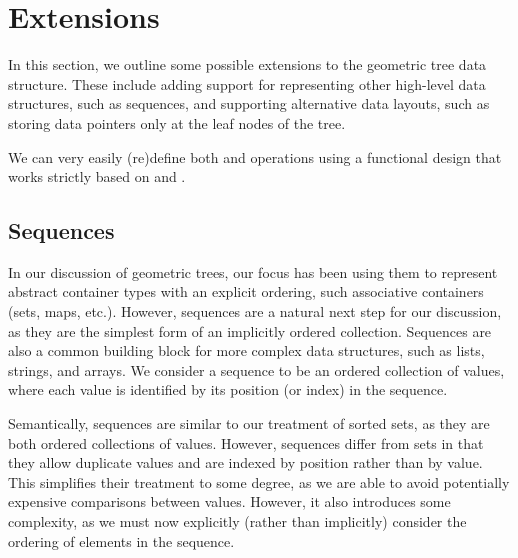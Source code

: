 \documentclass{article}
\let\oldnl\nl%
\newcommand{\nonl}{\renewcommand{\nl}{\let\nl\oldnl}}%
\begin{document}
\appendix

\section{Extensions}

In this section, we outline some possible extensions to the geometric tree data structure. These include adding support for representing other high-level data structures, such as sequences, and supporting alternative data layouts, such as storing data pointers only at the leaf nodes of the tree.

We can very easily (re)define both \insert and \delete operations using a functional design that works strictly based on \zip and \unzip.

\begin{algorithm}[!htb]
    \caption{Insert and delete functions based on (un)zip}
    \DontPrintSemicolon

    \nonl\;
    \setcounter{AlgoLine}{0}
\end{algorithm}

\subsection{Sequences}

In our discussion of geometric trees, our focus has been using them to represent abstract container types with an explicit ordering, such associative containers (sets, maps, etc.). However, sequences are a natural next step for our discussion, as they are the simplest form of an implicitly ordered collection. Sequences are also a common building block for more complex data structures, such as lists, strings, and arrays. We consider a sequence to be an ordered collection of values, where each value is identified by its position (or index) in the sequence.

Semantically, sequences are similar to our treatment of sorted sets, as they are both ordered collections of values. However, sequences differ from sets in that they allow duplicate values and are indexed by position rather than by value. This simplifies their treatment to some degree, as we are able to avoid potentially expensive comparisons between values. However, it also introduces some complexity, as we must now explicitly (rather than implicitly) consider the ordering of elements in the sequence.
\end{document}
